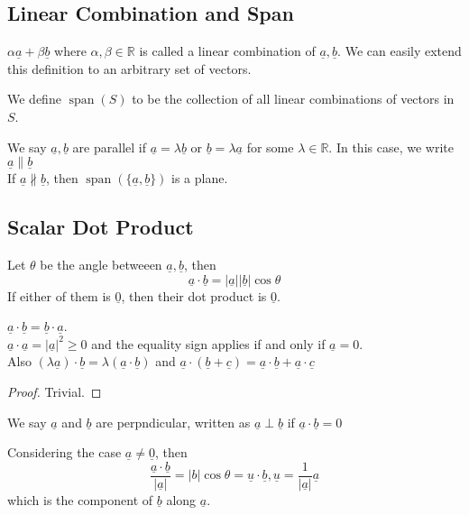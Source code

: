 \subsection{Linear Combination and Span}
$\alpha\underline{a}+\beta\underline{b}$ where $\alpha,\beta\in\mathbb R$ is called a linear combination of $\underline{a},\underline{b}$.
We can easily extend this definition to an arbitrary set of vectors.
\begin{definition}
    We define $\operatorname{span}(S)$ to be the collection of all linear combinations of vectors in $S$.
\end{definition}
We say $\underline{a},\underline{b}$ are parallel if $\underline{a}=\lambda \underline{b}$ or $\underline{b}=\lambda\underline{a}$ for some $\lambda\in\mathbb R$.
In this case, we write $\underline{a}\parallel\underline{b}$\\
If $\underline{a}\nparallel\underline{b}$, then $\operatorname{span}(\{\underline{a},\underline{b}\})$ is a plane.
\subsection{Scalar Dot Product}
\begin{definition}
    Let $\theta$ be the angle betweeen $\underline{a},\underline{b}$, then
    $$\underline{a}\cdot\underline{b}=|\underline{a}||\underline{b}|\cos\theta$$
    If either of them is $\underline{0}$, then their dot product is $\underline{0}$.
\end{definition}
\begin{proposition}
    $\underline{a}\cdot\underline{b}=\underline{b}\cdot\underline{a}$.\\
    $\underline{a}\cdot\underline{a}=|\underline{a}|^2\ge 0$ and the equality sign applies if and only if $\underline{a}=0$.\\
    Also $(\lambda\underline{a})\cdot\underline{b}=\lambda(\underline{a}\cdot\underline{b})$ and $\underline{a}\cdot(\underline{b}+\underline{c})=\underline{a}\cdot\underline{b}+\underline{a}\cdot\underline{c}$
\end{proposition}
\begin{proof}
    Trivial.
\end{proof}
\begin{definition}
    We say $\underline{a}$ and $\underline{b}$ are perpndicular, written as $\underline{a}\perp\underline{b}$ if $\underline{a}\cdot\underline{b}=0$
\end{definition}
Considering the case $\underline{a}\neq\underline{0}$, then
$$\frac{\underline{a}\cdot\underline{b}}{|\underline{a}|}=|b|\cos\theta=\underline{u}\cdot\underline{b}, \underline{u}=\frac{1}{|\underline{a}|}\underline{a}$$
which is the component of $\underline{b}$ along $\underline{a}$.

